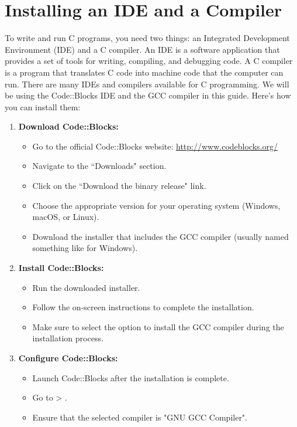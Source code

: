 \documentclass[12pt, openany]{book}
\begin{document}
  \section{Installing an IDE and a Compiler}
  To write and run C programs, you need two things: an Integrated Development Environment (IDE) and a C compiler. An IDE is a software application that provides a set of tools for writing, compiling, and debugging code. A C compiler is a program that translates C code into machine code that the computer can run. There are many IDEs and compilers available for C programming. We will be using the Code::Blocks IDE and the GCC compiler in this guide. Here's how you can install them:
  \begin{enumerate}
      \item \textbf{Download Code::Blocks:}
      \begin{itemize}
          \item Go to the official Code::Blocks website: \url{http://www.codeblocks.org/}
          \item Navigate to the ``Downloads" section.
          \item Click on the ``Download the binary release" link.
          \item Choose the appropriate version for your operating system (Windows, macOS, or Linux).
          \item Download the installer that includes the GCC compiler (usually named something like  for Windows).
      \end{itemize}
      \item \textbf{Install Code::Blocks:}
      \begin{itemize}
          \item Run the downloaded installer.
          \item Follow the on-screen instructions to complete the installation.
          \item Make sure to select the option to install the GCC compiler during the installation process.
      \end{itemize}
      \item \textbf{Configure Code::Blocks:}
      \begin{itemize}
          \item Launch Code::Blocks after the installation is complete.
          \item Go to  \textgreater{} .
          \item Ensure that the selected compiler is "GNU GCC Compiler".

\end{itemize}
\end{enumerate}
\end{document}
